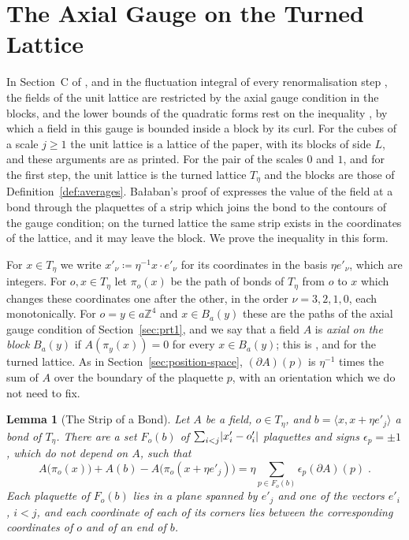 \documentclass[11pt]{preprint}
\DeclarePairedDelimiter{\abs}{\lvert}{\rvert}
\numberwithin{equation}{section}
\newtheorem{lemma}[theorem]{Lemma}
\theoremstyle{definition}
\theoremstyle{remark}
\theoremstyle{plain}
\begin{document}
\section{The Axial Gauge on the Turned Lattice}\label{sec:axial}

In Section~C of \cite{BalabanPRT2}, and in the fluctuation integral of every renormalisation step \cite[(2.152)]{BalabanPRT2}, the fields of the unit lattice are restricted by the axial gauge condition in the blocks, and the lower bounds of the quadratic forms rest on the inequality \cite[(2.123), p.~244]{BalabanPRT2}, by which a field in this gauge is bounded inside a block by its curl. For the cubes of a scale $j \geq 1$ the unit lattice is a lattice of the paper, with its blocks of side $L$, and these arguments are as printed. For the pair of the scales $0$ and $1$, and for the first step, the unit lattice is the turned lattice $T_\eta$ and the blocks are those of Definition~\ref{def:averages}. Ba{\l}aban's proof of \cite[(2.123)]{BalabanPRT2} expresses the value of the field at a bond through the plaquettes of a strip which joins the bond to the contours of the gauge condition; on the turned lattice the same strip exists in the coordinates of the lattice, and it may leave the block. We prove the inequality in this form.

For $x \in T_\eta$ we write $x'_\nu \coloneqq \eta^{-1}x \cdot e'_\nu$ for its coordinates in the basis $\eta e'_\nu$, which are integers. For $o, x \in T_\eta$ let $\pi_o(x)$ be the path of bonds of $T_\eta$ from $o$ to $x$ which changes these coordinates one after the other, in the order $\nu = 3, 2, 1, 0$, each monotonically. For $o = y \in a\mathbb Z^4$ and $x \in B_a(y)$ these are the paths of the axial gauge condition of Section~\ref{sec:prt1}, and we say that a field $A$ is \emph{axial on the block} $B_a(y)$ if $A(\pi_y(x)) = 0$ for every $x \in B_a(y)$; this is \cite[(1.10)]{BalabanPRT1}, and \cite[(2.121)]{BalabanPRT2} for the turned lattice. As in Section~\ref{sec:position-space}, $(\partial A)(p)$ is $\eta^{-1}$ times the sum of $A$ over the boundary of the plaquette $p$, with an orientation which we do not need to fix.

\begin{lemma}[The Strip of a Bond]\label{lem:strip-of-bond}
Let $A$ be a field, $o \in T_\eta$, and $b = \langle x, x + \eta e'_j\rangle$ a bond of $T_\eta$. There are a set $F_o(b)$ of $\sum_{i < j}\abs{x'_i - o'_i}$ plaquettes and signs $\epsilon_p = \pm1$, which do not depend on $A$, such that
\begin{equation}\label{eq:strip}
    A\bigl(\pi_o(x)\bigr) + A(b) - A\bigl(\pi_o(x + \eta e'_j)\bigr) = \eta\sum_{p \in F_o(b)}\epsilon_p(\partial A)(p)\;.
\end{equation}
Each plaquette of $F_o(b)$ lies in a plane spanned by $e'_j$ and one of the vectors $e'_i$, $i < j$, and each coordinate of each of its corners lies between the corresponding coordinates of $o$ and of an end of $b$.
\end{lemma}
\end{document}
